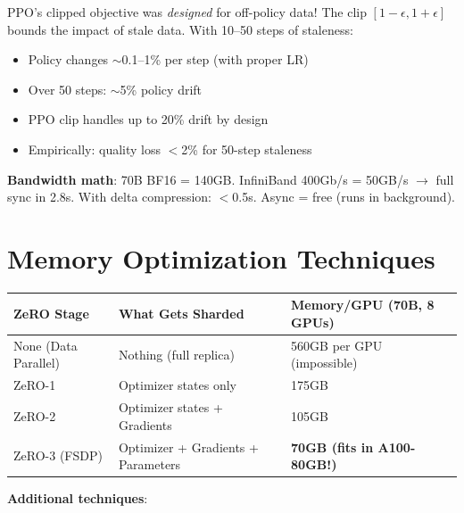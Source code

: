 \begin{intuitionbox}
PPO’s clipped objective was \emph{designed} for off-policy data! The clip $[1-\epsilon, 1+\epsilon]$ bounds the impact of stale data. With 10--50 steps of staleness:

\begin{itemize}
  \item Policy changes $\sim$0.1--1\% per step (with proper LR)
  \item Over 50 steps: $\sim$5\% policy drift
  \item PPO clip handles up to 20\% drift by design
  \item Empirically: quality loss $<$2\% for 50-step staleness
\end{itemize}

\textbf{Bandwidth math}: 70B BF16 = 140GB. InfiniBand 400Gb/s = 50GB/s $\rightarrow$ full sync in 2.8s. With delta compression: $<$0.5s. Async = free (runs in background).
\end{intuitionbox}

\section{Memory Optimization Techniques}
\label{memory-optimization-techniques}

\begin{tabular}{@{}lp{5cm}p{8cm}@{}}
\toprule
\textbf{ZeRO Stage} & \textbf{What Gets Sharded} & \textbf{Memory/GPU (70B, 8 GPUs)} \\
\midrule
None (Data Parallel) & Nothing (full replica) & 560GB per GPU (impossible) \\
ZeRO-1 & Optimizer states only & 175GB \\
ZeRO-2 & Optimizer states + Gradients & 105GB \\
ZeRO-3 (FSDP) & Optimizer + Gradients + Parameters & \textbf{70GB (fits in A100-80GB!)} \\
\bottomrule
\end{tabular}

\textbf{Additional techniques}:

